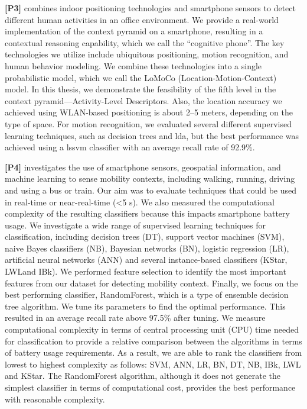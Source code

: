 \textbf{[P3]} combines indoor positioning technologies and smartphone sensors to detect different human activities in an office environment. We provide a real-world implementation of the context pyramid on a smartphone, resulting in a contextual reasoning capability, which we call the ``cognitive phone''. The key technologies we utilize include ubiquitous positioning, motion recognition, and human behavior modeling. We combine these technologies into a single probabilistic model, which we call the LoMoCo (Location-Motion-Context) model. In this thesis, we demonstrate the feasibility of the fifth level in the context pyramid---Activity-Level Descriptors. Also, the location accuracy we achieved using WLAN-based positioning is about 2--5 meters, depending on the type of space. For motion recognition, we evaluated several different supervised learning techniques, such as decision trees and \gls{lda}, but the best performance was achieved using a \gls{lssvm} classifier with an average recall rate of 92.9\%.

\textbf{[P4]} investigates the use of smartphone sensors, geospatial information, and machine learning to sense mobility contexts, including walking, running, driving and using a bus or train. Our aim was to evaluate techniques that could be used  in real-time or  near-real-time (<5 s). We also measured the computational complexity of the resulting classifiers because this impacts smartphone battery usage. We investigate a wide range of supervised learning techniques for
classification, including decision trees (DT), support vector machines (SVM), naive Bayes classifiers (NB), Bayesian networks (BN), logistic regression (LR), artificial neural networks (ANN) and several instance-based classifiers (KStar, LWLand IBk). We performed feature selection to identify the most important features from our dataset for detecting mobility context. Finally, we focus on the best performing classifier, RandomForest, which is a type of ensemble decision tree algorithm. We tune its parameters to find the optimal performance. This resulted in an average recall rate above 97.5\% after tuning. We measure computational complexity in terms of central processing unit (CPU) time needed for classification to provide a relative comparison between the algorithms in terms of battery usage requirements. As a result, we are able to rank the classifiers from lowest to highest complexity as follows: SVM, ANN, LR, BN, DT, NB, IBk, LWL and KStar. The RandomForest algorithm, although it does not generate the simplest classifier in terms of computational cost, provides the best performance with reasonable complexity.

